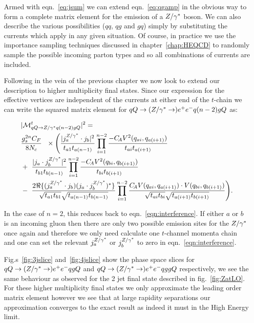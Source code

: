		Armed with eqn.~\eqref{eq:jsum} we can extend eqn.~\eqref{eq:qgamp} in the obvious way
		to form a complete matrix element for the emission of a $Z/\gamma^*$ boson.  We can also
		describe the various possibilities ($qq$, $qg$ and $gq$) simply by substituting
		the currents which apply in any given situation.  Of course, in practice we use
		the importance sampling techniques discussed in chapter~\ref{chap:HEQCD} to
		randomly sample the possible incoming parton types and so all combinations of
		currents are included.

		Following in the vein of the previous chapter we now look to extend our description
		to higher multiplicity final states.  Since our expression for the effective vertices are
		independent of the currents at either end of the $t$-chain we can write the squared matrix element for
		$qQ\to (Z/\gamma^*\to ) e^+e^- q (n-2)g Q$ as:

		\begin{align}
		\begin{split}
		    &|\mathcal{M}^{t}_{qQ\to Z/\gamma^* q(n-2)gQ}|^2 = \\&\frac{g_s^{2n}C_F}{8N_c}\
		    \ \times \Bigg( \frac{| j_a^{Z/\gamma^*}\cdot j_b|^2}{t_{a1}t_{a(n-1)}} \prod^{n-2}_{i=1} \frac{-C_{\!A} V^2(q_{ai},
		      q_{a(i+1)})}{t_{ai} t_{a(i+1)}}  \\ & + \ \frac{|j_a \cdot j_b^{Z/\gamma^*} |^2}{t_{b1}t_{b(n-1)}}
		    \prod^{n-2}_{i=1}\frac{-C_{\!A} V^2(q_{bi}, q_{b(i+1)})}{t_{bi} t_{b(i+1)}}  \\
		    &-\ \frac{2\Re\{(j_a^{Z/\gamma^*}\cdot j_b)({j_a \cdot
		        j_b^{Z/\gamma^*}})^*\}}{\sqrt{t_{a1}t_{b1}}\sqrt{t_{a(n-1)} t_{b(n-1)}}}
		    \prod^{n-2}_{i=1}\frac{C_{\!A} V(q_{ai}, q_{a(i+1)})\cdot V(q_{bi},
		      q_{b(i+1)})}{\sqrt{t_{ai}t_{bi}} \sqrt{t_{a(i+1)}t_{b(i+1)}}}\Bigg).
			\label{eq:allorderreal}
		\end{split}
		\end{align}

		In the case of $n=2$, this reduces back to eqn.~\eqref{eqn:interference}.  If
		either $a$ or $b$ is an incoming gluon then there are only two possible emission sites
		for the $Z/\gamma^*$ once again and therefore we only need calculate one $t$-channel momenta chain
		and one can set the relevant $j_a^{Z/\gamma^*}$ or $j_b^{Z/\gamma^*}$ to
		zero in eqn.~\eqref{eqn:interference}.

		Fig.s~\eqref{fig:3jslice} and~\eqref{fig:4jslice} show the phase space
		slices for $qQ\to(Z/\gamma^*\to)e^+e^-qgQ$ and $qQ\to(Z/\gamma^*\to)e^+e^-qggQ$
		respectively, we see the same behaviour as observed for the 2 jet final state described in
		fig.~\eqref{fig:ZatLO}.  For these higher multiplicity final states we only
		approximate the leading order matrix element however we see that at large rapidity separations
		our approximation converges to the exact result as indeed it must in the High Energy limit.

